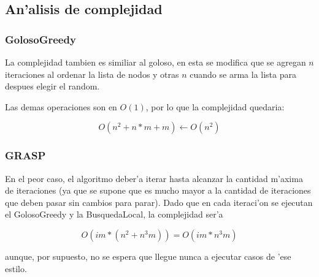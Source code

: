\subsection{An'alisis de complejidad}
\subsubsection{GolosoGreedy}
La complejidad tambien es similiar al goloso, en esta se modifica que se agregan $n$ iteraciones al ordenar la lista de nodos y otras $n$ cuando se arma la lista para despues elegir el random.

Las demas operaciones son en $O(1)$, por lo que la complejidad quedaria: 

$$O(n^{2}+n*m+m) \leftarrow O(n^2)$$


\subsubsection{GRASP}
En el peor caso, el algoritmo deber'a iterar hasta alcanzar la cantidad m'axima de iteraciones (ya que se supone que es mucho mayor a la cantidad de iteraciones que deben pasar sin cambios para parar). Dado que en cada iteraci'on se ejecutan el GolosoGreedy y la BusquedaLocal, la complejidad ser'a 

$$O(im * (n^2 + n^3m)) = O(im * n^3m)$$

aunque, por supuesto, no se espera que llegue nunca a ejecutar casos de 'ese estilo.
